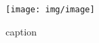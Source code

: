 \begin{figure}[hbtp]
    \centering
    \texttt{[image: img/image]}
    \caption{caption}
    \label{fig:label}
\end{figure}
